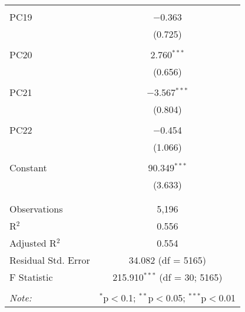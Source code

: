 \begin{table}[!htbp]
\begin{tabular}{@{\extracolsep{5pt}}lc}
  & \\ 
 PC19 & $-$0.363 \\ 
  & (0.725) \\ 
  & \\ 
 PC20 & 2.760$^{***}$ \\ 
  & (0.656) \\ 
  & \\ 
 PC21 & $-$3.567$^{***}$ \\ 
  & (0.804) \\ 
  & \\ 
 PC22 & $-$0.454 \\ 
  & (1.066) \\ 
  & \\ 
 Constant & 90.349$^{***}$ \\ 
  & (3.633) \\ 
  & \\ 
\hline \\[-1.8ex] 
Observations & 5,196 \\ 
R$^{2}$ & 0.556 \\ 
Adjusted R$^{2}$ & 0.554 \\ 
Residual Std. Error & 34.082 (df = 5165) \\ 
F Statistic & 215.910$^{***}$ (df = 30; 5165) \\ 
\hline 
\hline \\[-1.8ex] 
\textit{Note:}  & \multicolumn{1}{r}{$^{*}$p$<$0.1; $^{**}$p$<$0.05; $^{***}$p$<$0.01} \\ 
\end{tabular} 
\end{table} 
